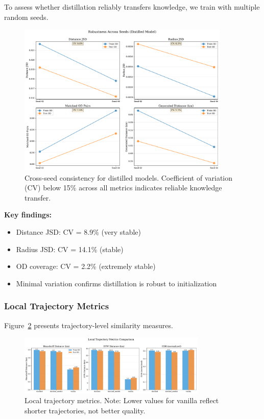 To assess whether distillation reliably transfers knowledge, we train with multiple random seeds.

\begin{figure}[h]
\centering
\includegraphics[width=0.9\textwidth]{assets/plots/hoser/seed_robustness.pdf}
\caption{Cross-seed consistency for distilled models. Coefficient of variation (CV) below 15\% across all metrics indicates reliable knowledge transfer.}
\label{fig:seed-robustness}
\end{figure}

\textbf{Key findings:}
\begin{itemize}[noitemsep,topsep=0pt]
\item Distance JSD: CV = 8.9\% (very stable)
\item Radius JSD: CV = 14.1\% (stable)
\item OD coverage: CV = 2.2\% (extremely stable)
\item Minimal variation confirms distillation is robust to initialization
\end{itemize}

\subsubsection{Local Trajectory Metrics}

Figure~\ref{fig:local-metrics} presents trajectory-level similarity measures.

\begin{figure}[h]
\centering
\includegraphics[width=0.8\textwidth]{assets/plots/hoser/local_metrics.pdf}
\caption{Local trajectory metrics. Note: Lower values for vanilla reflect shorter trajectories, not better quality.}
\label{fig:local-metrics}
\end{figure}

